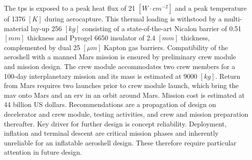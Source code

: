 \newline
\newline
The \acrlong{tps} is exposed to a peak heat flux of 21 $\left[W \cdot cm^{-2}\right]$ and a peak temperature of 1376 $\left[K\right]$ during aerocapture. This thermal loading is withstood by a multi-material lay-up 256 $\left[kg\right]$ consisting of a state-of-the-art Nicalon barrier of 0.51 $\left[mm\right]$ thickness and Pyrogel 6650 insulator of 2.4 $\left[mm\right]$ thickness, complemented by dual 25 $\left[\mu m\right]$ Kapton gas barriers. 
\newline
\newline
Compatibility of the aeroshell with a manned Mars mission is ensured by preliminary crew module and mission design. The crew module accommodates two crew members for a 100-day interplanetary mission and its mass is estimated at 9000 $\left[kg\right]$. Return from Mars requires two launches prior to crew module launch, which bring the \acrlong{mav} onto Mars and an \acrlong{erv} in an orbit around Mars. Mission cost is estimated at 44 billion US dollars.
\newline
\newline
Recommendations are a propagation of design on decelerator and crew module, testing activities, and crew and mission preparation thereafter. Key driver for further design is concept reliability. Deployment, inflation and terminal descent are critical mission phases and inherently unreliable for an inflatable aeroshell design. These therefore require particular attention in future design.
